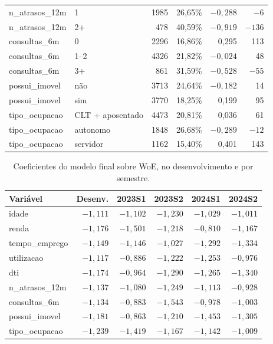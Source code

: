 \documentclass[11pt,a4paper]{article}
\begin{document}
\begin{table}[H]
\begin{tabular}{llrrrr}
n\_atrasos\_12m & 1 & 1985 & 26,65\% & $-0{,}288$ & $-6$ \\
n\_atrasos\_12m & 2+ & 478 & 40,59\% & $-0{,}919$ & $-136$ \\
\addlinespace
consultas\_6m & 0 & 2296 & 16,86\% & 0,295 & 113 \\
consultas\_6m & 1--2 & 4326 & 21,82\% & $-0{,}024$ & 48 \\
consultas\_6m & 3+ & 861 & 31,59\% & $-0{,}528$ & $-55$ \\
\addlinespace
possui\_imovel & não & 3713 & 24,64\% & $-0{,}182$ & 14 \\
possui\_imovel & sim & 3770 & 18,25\% & 0,199 & 95 \\
\addlinespace
tipo\_ocupacao & CLT + aposentado & 4473 & 20,81\% & 0,036 & 61 \\
tipo\_ocupacao & autonomo & 1848 & 26,68\% & $-0{,}289$ & $-12$ \\
tipo\_ocupacao & servidor & 1162 & 15,40\% & 0,401 & 143 \\
\bottomrule
\end{tabular}
\end{table}

\begin{table}[H]
\centering\small
\caption{Coeficientes do modelo final sobre WoE, no desenvolvimento e por semestre.}
\label{tab:betas-fin}
\begin{tabular}{lrrrrr}
\toprule
Variável & Desenv. & 2023S1 & 2023S2 & 2024S1 & 2024S2 \\
\midrule
idade & $-1{,}111$ & $-1{,}102$ & $-1{,}230$ & $-1{,}029$ & $-1{,}011$ \\
renda & $-1{,}176$ & $-1{,}501$ & $-1{,}218$ & $-0{,}810$ & $-1{,}167$ \\
tempo\_emprego & $-1{,}149$ & $-1{,}146$ & $-1{,}027$ & $-1{,}292$ & $-1{,}334$ \\
utilizacao & $-1{,}117$ & $-0{,}886$ & $-1{,}222$ & $-1{,}253$ & $-0{,}976$ \\
dti & $-1{,}174$ & $-0{,}964$ & $-1{,}290$ & $-1{,}265$ & $-1{,}340$ \\
n\_atrasos\_12m & $-1{,}137$ & $-1{,}080$ & $-1{,}249$ & $-1{,}113$ & $-0{,}928$ \\
consultas\_6m & $-1{,}134$ & $-0{,}883$ & $-1{,}543$ & $-0{,}978$ & $-1{,}003$ \\
possui\_imovel & $-1{,}181$ & $-0{,}863$ & $-1{,}210$ & $-1{,}453$ & $-1{,}305$ \\
tipo\_ocupacao & $-1{,}239$ & $-1{,}419$ & $-1{,}167$ & $-1{,}142$ & $-1{,}009$ \\
\bottomrule
\end{tabular}
\end{table}
\end{document}
